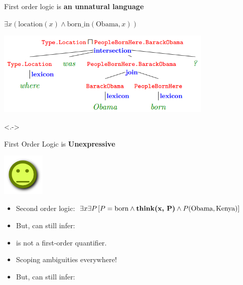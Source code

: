 \begin{frame}{First order logic is \textbf{an unnatural language}}

\begin{center}
$\exists x \left( \textrm{location}(x) \land \textrm{born\_in}(\textrm{Obama}, x) \right)$
\end{center}
\vspace{1ex}

\begin{center}
  \includegraphics[height=4cm]{../img/sempre.png}
\end{center}

\footnotetext<.->{\cite{key:2013berant-sempre}}
\end{frame}


\begin{frame}{First Order Logic is \textbf{Unexpressive}}
\begin{center}
  \includegraphics[height=2cm]{../img/pokerface.png}
\end{center}

\begin{itemize}
\item Second order logic: 
      $\exists x \exists P \left[ P = \textrm{born} \land \textbf{\textrm{think}(x, P)} \land P(\textrm{Obama}, \textrm{Kenya}) \right]$
\pause
\item But, can still infer: 
\end{itemize}
\vspace{1ex}
\pause


\begin{itemize}
\item {} is not a first-order quantifier.
\item Scoping ambiguities everywhere!
\pause
\item But, can still infer: 
\end{itemize}
\end{frame}


